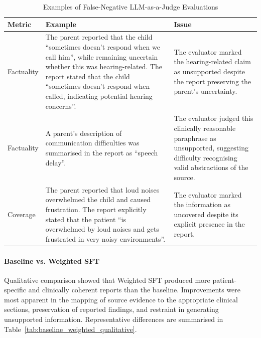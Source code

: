 \documentclass[ %
                    author={Aman Kumar Singh},
                supervisor={Dr. Edwin Simpson},
                    degree={MSc},
                     title={Quality-Aware Knowledge Distillation of Large Language Models for Efficient Personalised Clinical Report Generation},
                  subtitle={},
                      type={},
                      year={2021}]{dissertation}
\begin{document}
\vspace{-8pt}
\begin{table}[H]
\centering
\scriptsize
\caption{Examples of False-Negative LLM-as-a-Judge Evaluations}
\label{tab:judge_errors}
\begin{tabular}{p{} p{} p{}}
\hline
\textbf{Metric} & \textbf{Example} & \textbf{Issue} \\
\hline

Factuality
&
The parent reported that the child ``sometimes doesn't respond when we
call him'', while remaining uncertain whether this was hearing-related.
The report stated that the child ``sometimes doesn't respond when called,
indicating potential hearing concerns''.
&
The evaluator marked the hearing-related claim as unsupported despite the
report preserving the parent's uncertainty.
\\

Factuality
&
A parent's description of communication difficulties was summarised in the
report as ``speech delay''.
&
The evaluator judged this clinically reasonable paraphrase as unsupported,
suggesting difficulty recognising valid abstractions of the source.
\\

Coverage
&
The parent reported that loud noises overwhelmed the child and caused
frustration. The report explicitly stated that the patient ``is overwhelmed
by loud noises and gets frustrated in very noisy environments''.
&
The evaluator marked the information as uncovered despite its explicit
presence in the report.
\\

\hline
\end{tabular}
\end{table}
\vspace{-8pt}
\paragraph{Baseline vs. Weighted SFT}

Qualitative comparison showed that Weighted SFT produced more patient-specific
and clinically coherent reports than the baseline. Improvements were most
apparent in the mapping of source evidence to the appropriate clinical
sections, preservation of reported findings, and restraint in generating
unsupported information. Representative differences are summarised in
Table~\ref{tab:baseline_weighted_qualitative}.
\end{document}
